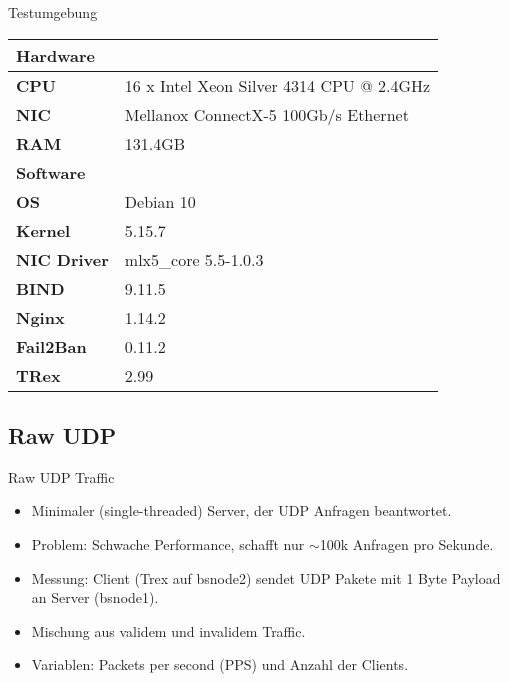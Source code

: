 \documentclass[11pt,german,table,dvipsnames]{beamer}
\begin{document}
\begin{frame}{Testumgebung}

\begin{table}[b!]
	 \centering
	\begin{tabular}{ll}
	\toprule
	\multicolumn{2}{l}{\textbf{Hardware}}                                        \\ \midrule
	\textbf{CPU}        & 16 x Intel Xeon Silver 4314 CPU @ 2.4GHz \\
	\textbf{NIC}        &  Mellanox ConnectX-5 100Gb/s Ethernet                     \\
	\textbf{RAM}        & 131.4GB                                                       \\ \bottomrule 
	\multicolumn{2}{l}{\textbf{Software}}                                        \\ \midrule
	\textbf{OS}         & Debian 10                                                  \\
	\textbf{Kernel}          & 5.15.7                                                     \\
	\textbf{NIC Driver}  & mlx5\_core 5.5-1.0.3                                      \\
	\textbf{BIND}       & 9.11.5                                    \\
    \textbf{Nginx} & 1.14.2 \\
	\textbf{Fail2Ban}       & 0.11.2                                   \\
	\textbf{TRex}            & 2.99                                        \\ \bottomrule
	\end{tabular}
	\end{table}

    
\end{frame}

\subsection{Raw UDP}
    
\begin{frame}{Raw UDP Traffic}
    \begin{itemize}
        \item Minimaler (single-threaded) Server, der UDP Anfragen beantwortet.
        \item Problem: Schwache Performance, schafft nur $\sim$100k Anfragen pro Sekunde.
        \item Messung: Client (Trex auf bsnode2) sendet UDP Pakete mit 1 Byte Payload an Server (bsnode1). 
        \item Mischung aus validem und invalidem Traffic.
        \item Variablen: Packets per second (PPS) und Anzahl der Clients.
    \end{itemize}
\end{frame}
\end{document}
